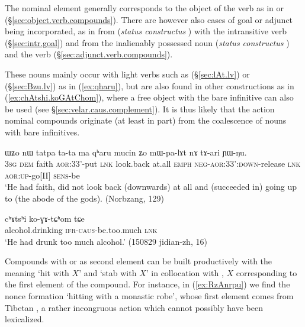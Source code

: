 The nominal element generally corresponds to the object of the verb as in  or  (§\ref{sec:object.verb.compounds}). There are however also cases of goal or adjunct being incorporated, as in  from  (\textit{status constructus} ) with the intransitive verb  (§\ref{sec:intr.goal}) and  from the inalienably possessed noun  (\textit{status constructus} ) and the verb  (§\ref{sec:adjunct.verb.compounds}).

These nouns mainly occur with light verbs such as  (§\ref{sec:lAt.lv}) or   (§\ref{sec:Bzu.lv})  as in  (\ref{ex:qharu}), but are also found in other constructions as in (\ref{ex:chAtshi.koGAtChom}), where a free object  with the bare infinitive  can also be used (see §\ref{sec:velar.caus.complement}). It is thus likely that the action nominal compounds originate (at least in part) from the coalescence of nouns with bare infinitives.

\begin{exe}
\ex \label{ex:qharu}
\gll ɯʑo nɯ  tatpa ta-ta ma qʰaru mucin ʑo mɯ-pa-lɤt nɤ tɤ-ari ɲɯ-ŋu. \\
\textsc{3sg} \textsc{dem} faith \textsc{aor}:3\fl{}3'-put \textsc{lnk} look.back at.all \textsc{emph} \textsc{neg}-\textsc{aor}:3\fl{}3':\textsc{down}-release \textsc{lnk} \textsc{aor}:\textsc{up}-go[II] \textsc{sens}-be \\
\glt `He had faith, did not look back (downwards) at all and (succeeded in) going up to (the abode of the gods). (Norbzang, 129)
\end{exe}

\begin{exe}
\ex \label{ex:chAtshi.koGAtChom}
 \gll cʰɤtsʰi ko-ɣɤ-tɕʰom tɕe  \\
 alcohol.drinking \textsc{ifr}-\textsc{caus}-be.too.much \textsc{lnk} \\
\glt `He had drunk too much alcohol.' (150829 jidian-zh, 16)
\end{exe}

Compounds with  or  as second element can be built productively with the meaning `hit with $X$' and `stab with $X$' in collocation with , $X$ corresponding to the first element of the compound. For instance, in (\ref{ex:RzAnrpu}) we find the nonce formation  `hitting with a monastic robe', whose first element  comes from Tibetan , a rather incongruous action which cannot possibly have been lexicalized.
 
